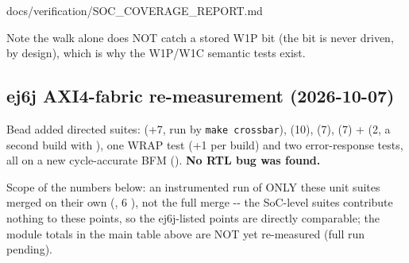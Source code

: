 \begin{relocated}{docs/verification/SOC_COVERAGE_REPORT.md}
{}

Note the walk alone does NOT catch a stored W1P bit (the bit is never
driven, by design), which is why the W1P/W1C semantic tests exist.

\subsection{ej6j AXI4-fabric re-measurement (2026-10-07)}\label{tm:flow:soc-coverage-report:ej6j-axi4-fabric-re-measurement-2026-10-07}

Bead  added directed suites: 
(+7, run by \texttt{make\ crossbar}), 
(10),  (7),  (7) +
 (2, a second build with
), one  WRAP test (+1 per
build) and two  error-response tests, all on a new
cycle-accurate BFM (). \textbf{No RTL bug was
found.}

Scope of the numbers below: an instrumented run of ONLY these unit
suites merged on their own (, 6 ), not the
full  merge -\/- the SoC-level suites contribute
nothing to these points, so the ej6j-listed points are directly
comparable; the module totals in the main table above are NOT yet
re-measured (full run pending).

{\footnotesize\setlength{\tabcolsep}{3pt}

}
\end{relocated}
